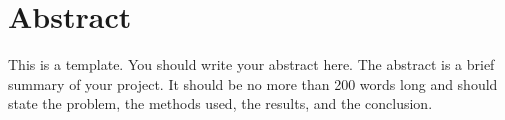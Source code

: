 \section*{Abstract}
\label{sec:abstract}

This is a template. You should write your abstract here.
The abstract is a brief summary of your project. It should be no more than 200 words long and should state the problem, the methods used, the results, and the conclusion.

\newpage